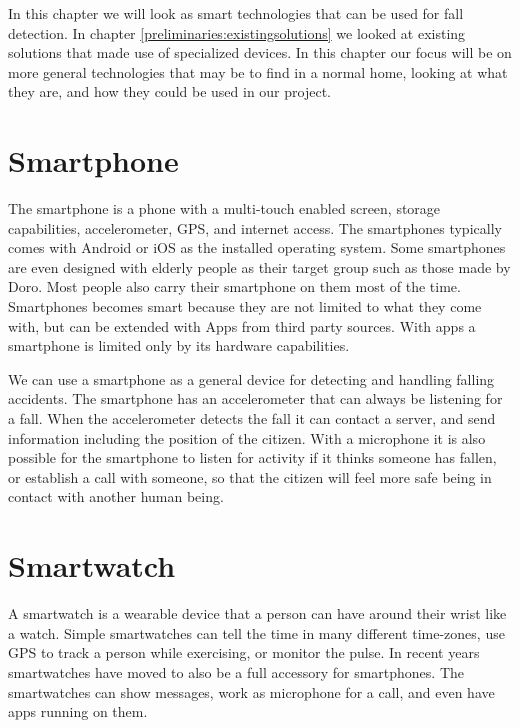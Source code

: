 \label{chap:technologies}
In this chapter we will look as smart technologies that can be used for fall detection. In chapter \ref{preliminaries:existingsolutions} we looked at existing solutions that made use of specialized devices. In this chapter our focus will be on more general technologies that may be to find in a normal home, looking at what they are, and how they could be used in our project.


\section*{Smartphone} \label{technologies:smartphone}
The smartphone is a phone with a multi-touch enabled screen, storage capabilities, accelerometer, GPS, and internet access. The smartphones typically comes with Android or iOS as the installed operating system. Some smartphones are even designed with elderly people as their target group such as those made by Doro.  Most people also carry their smartphone on them most of the time.
Smartphones becomes smart because they are not limited to what they come with, but can be extended with Apps from third party sources. With apps a smartphone is limited only by its hardware capabilities.

We can use a smartphone as a general device for detecting and handling falling accidents. The smartphone has an accelerometer that can always be listening for a fall. When the accelerometer detects the fall it can contact a server, and send information including the position of the citizen. With a microphone it is also possible for the smartphone to listen for activity if it thinks someone has fallen, or establish a call with someone, so that the citizen will feel more safe being in contact with another human being.

\section*{Smartwatch}
A smartwatch is a wearable device that a person can have around their wrist like a watch. Simple smartwatches can tell the time in many different time-zones, use GPS to track a person while exercising, or monitor the pulse.
In recent years smartwatches have moved to also be a full accessory for smartphones. The smartwatches can show messages, work as microphone for a call, and even have apps running on them.


